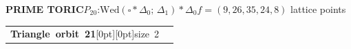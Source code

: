 \documentclass[14pt]{extarticle}
\makeatletter
\newcommand{\AtlasSupportOrbitSplit}[2]{%
  \begin{tabularx}{\linewidth}[t]{%
    @{}>{\raggedright\arraybackslash}p{.37\linewidth}%
    @{\hspace{2.5mm}\AtlasOrbitDivider\hspace{2.5mm}}%
    >{\raggedright\arraybackslash}X@{}}%
    \begin{minipage}[t]{\linewidth}\vspace{0pt}#1\end{minipage} &
    \begin{minipage}[t]{\linewidth}\vspace{0pt}#2\end{minipage}
  \end{tabularx}}
\makeatother
\begin{document}
\begin{atlasbox}\begin{atlaspanel}
\textcolor{toricgreen}{\bfseries PRIME TORIC}\quad \(P_{20}\):\enspace \(\mathrm{Wed}(\square\ast\Delta_{0};\,\Delta_1)\ast\Delta_{0}\)\quad \(f=(9,26,35,24,8)\) lattice points
\end{atlaspanel}\end{atlasbox}
\clearpage
\begin{atlaspanel}[top=1mm,bottom=2mm]
\AtlasSupportOrbitSplit{%
\vspace*{-3mm}\mbox{{\LARGE\bfseries Triangle orbit 21}\hspace{3mm}\raisebox{.8mm}[0pt][0pt]{{\fontsize{16}{18}\selectfont\color{muted}size 2}}}%
}{%
\vspace*{-3mm}{\fontsize{13}{16}\selectfont{\color{muted}\(\mathbb{Q}\) and \(\mathbb{F}_2\)}\quad{\color{muted}\(\underline{\{7,\,12,\,40\}}\), \(\{6,\,11,\,41\}\)}\rule[-3mm]{0pt}{3mm}}%
}%
\end{atlaspanel}\vspace{2mm}
\end{document}
